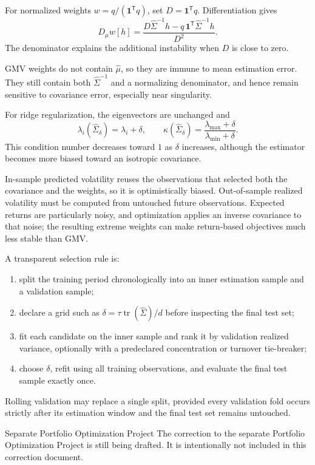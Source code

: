 \documentclass[10pt]{article}
\newcommand{\trans}{^{\mathsf T}}
\begin{document}
For normalized weights \(w=q/(\mathbf1\trans q)\), set
\(D=\mathbf1\trans q\). Differentiation gives
\[
D_\mu w[h]
=\frac{D\widehat\Sigma^{-1}h
-q\,\mathbf1\trans\widehat\Sigma^{-1}h}{D^2}.
\]
The denominator explains the additional instability when \(D\) is close to
zero.

GMV weights do not contain \(\widehat\mu\), so they are immune to mean
estimation error. They still contain both \(\widehat\Sigma^{-1}\) and a
normalizing denominator, and hence remain sensitive to covariance error,
especially near singularity.

For ridge regularization, the eigenvectors are unchanged and
\[
\lambda_i(\widehat\Sigma_\delta)=\lambda_i+\delta,
\qquad
\kappa(\widehat\Sigma_\delta)
=\frac{\lambda_{\max}+\delta}{\lambda_{\min}+\delta}.
\]
This condition number decreases toward \(1\) as \(\delta\) increases, although
the estimator becomes more biased toward an isotropic covariance.

In-sample predicted volatility reuses the observations that selected both the
covariance and the weights, so it is optimistically biased. Out-of-sample
realized volatility must be computed from untouched future observations.
Expected returns are particularly noisy, and optimization applies an inverse
covariance to that noise; the resulting extreme weights can make return-based
objectives much less stable than GMV.

A transparent selection rule is:
\begin{enumerate}
  \item split the training period chronologically into an inner estimation
  sample and a validation sample;
  \item declare a grid such as
  \(\delta=\tau\operatorname{tr}(\widehat\Sigma)/d\) before inspecting the
  final test set;
  \item fit each candidate on the inner sample and rank it by validation
  realized variance, optionally with a predeclared concentration or turnover
  tie-breaker;
  \item choose \(\delta\), refit using all training observations, and evaluate
  the final test sample exactly once.
\end{enumerate}
Rolling validation may replace a single split, provided every validation fold
occurs strictly after its estimation window and the final test set remains
untouched.

\begin{projectbox}{Separate Portfolio Optimization Project}
The correction to the separate Portfolio Optimization Project is still being
drafted. It is intentionally not included in this correction document.
\end{projectbox}
\end{document}
